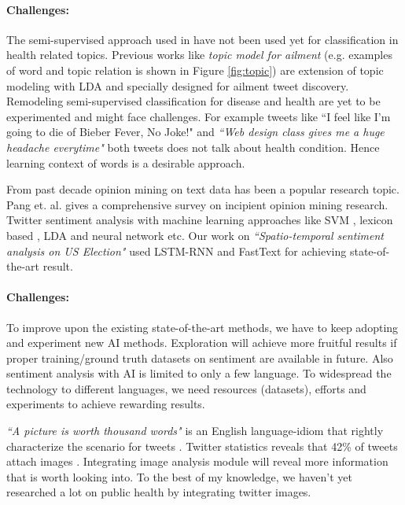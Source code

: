 \vspace{-2mm}
\paragraph{Challenges:}
The semi-supervised approach used in \cite{paul2017compass} have not been used yet for classification in health related topics. Previous works like {\em topic model for ailment} \cite{paul2012model} (e.g. examples of word and topic relation is shown in  Figure \ref{fig:topic}) are extension of topic modeling with LDA and specially designed for ailment tweet discovery. Remodeling semi-supervised classification for disease and health are yet to be experimented and might face challenges.
For example tweets like {``I feel like I'm going to die of Bieber Fever, No Joke!"} and  {\em ``Web design class gives me a huge headache everytime"} both tweets does not talk about health condition. Hence learning context of words is a desirable approach.

From past decade opinion mining on text data has been a popular research topic. Pang et. al. \cite{pang2008opinion} gives a comprehensive survey on incipient opinion mining research. Twitter sentiment analysis with machine learning approaches like SVM \cite{joachims1998text}, lexicon based \cite{taboada2011lexicon}, LDA \cite{duric2012feature,kouloumpis2011twitter} and neural network \cite{dos2014deep,tang2015document} etc. Our work on {\em ``Spatio-temporal sentiment analysis on US Election"} used LSTM-RNN {\em } and FastText for achieving state-of-the-art result.

\vspace{-2mm}
\paragraph{Challenges:}
To improve upon the existing state-of-the-art methods, we have to keep adopting and experiment new AI methods. Exploration will achieve more fruitful results if proper training/ground truth datasets on sentiment are available in future. Also sentiment analysis with AI is limited to only a few language. To widespread the technology to different languages, we need resources (datasets), efforts and experiments to achieve rewarding results.


{\em ``A picture is worth thousand words"}  is an English language-idiom that rightly characterize the scenario for tweets \cite{advice1911syracuse}. Twitter statistics reveals that 42\% of tweets attach images \cite{tweets_images}. Integrating image analysis module will reveal more information that is worth looking into.
To the best of my knowledge, we haven't yet researched a lot on public health by integrating twitter images.

